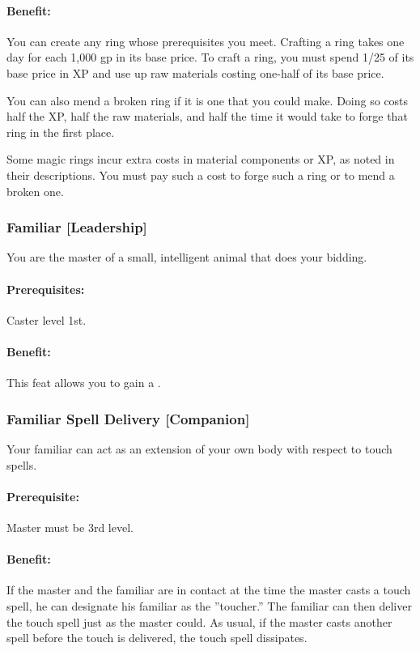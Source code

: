 \paragraph{Benefit:}
You can create any ring whose prerequisites you meet. 
Crafting a ring takes one day for each 1,000 gp in its base price. 
To craft a ring, you must spend 1/25 of its base price in XP and use up raw materials costing one-half of its base price.
 
You can also mend a broken ring if it is one that you could make. 
Doing so costs half the XP, half the raw materials, and half the time it would take to forge that ring in the first place.

Some magic rings incur extra costs in material components or XP, as noted in their descriptions. 
You must pay such a cost to forge such a ring or to mend a broken one.

\subsubsection[Familiar]{Familiar [Leadership]}
\label{Feat:Familiar}
You are the master of a small, intelligent animal that does your bidding.

\paragraph{Prerequisites:} Caster level 1st.

\paragraph{Benefit:} This feat allows you to gain a .

\subsubsection[Familiar Spell Delivery]{Familiar Spell Delivery [Companion]}
\label{Feat:FamiliarSpellDelivery}
Your familiar can act as an extension of your own body with respect to touch spells.

\paragraph{Prerequisite:} Master must be 3rd level.

\paragraph{Benefit:} If the master and the familiar are in contact at the time the master casts a touch spell, he can designate his familiar as the ''toucher.'' 
The familiar can then deliver the touch spell just as the master could. 
As usual, if the master casts another spell before the touch is delivered, the touch spell dissipates. 

